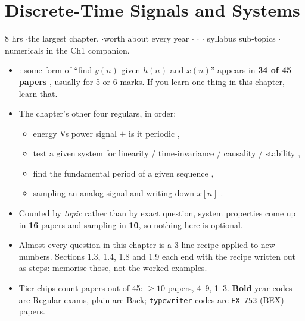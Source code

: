 \section{Discrete-Time Signals and Systems}

{\color{sub}\footnotesize 8 hrs \gap$\cdot$\gap the largest chapter,  \gap$\cdot$\gap worth about  every year \gap$\cdot$\gap {} \gap$\cdot$\gap {}
\gap$\cdot$ syllabus sub-topics \gap$\cdot$\gap numericals in the Ch1 companion.}

\begin{itemize}
  \item {}: some form of
        ``find $y(n)$ given $h(n)$ and $x(n)$'' appears in \textbf{34 of 45 papers} ,
        usually for 5 or 6 marks. If you learn one thing in this chapter, learn that.
  \item The chapter's other four regulars, in order:
  \begin{itemize}
    \item energy Vs power signal $+$ is it periodic ,
    \item test a given system for linearity / time-invariance / causality / stability ,
    \item find the fundamental period of a given sequence ,
    \item sampling an analog signal and writing down $x[n]$ .
  \end{itemize}
  \item Counted by \emph{topic} rather than by exact question, system properties come up in
        \textbf{16} papers and sampling in \textbf{10}, so nothing here is optional.
  \item {} Almost every question in this
        chapter is a 3-line recipe applied to new numbers. Sections 1.3, 1.4, 1.8 and 1.9 each
        end with the recipe written out as steps: memorise those, not the worked examples.
  \item Tier chips count papers out of 45:  $\ge10$ papers,  4--9,  1--3.
        \textbf{Bold} year codes are Regular exams, plain are Back;
        \texttt{typewriter} codes are \texttt{EX 753} (BEX) papers.
\end{itemize}

